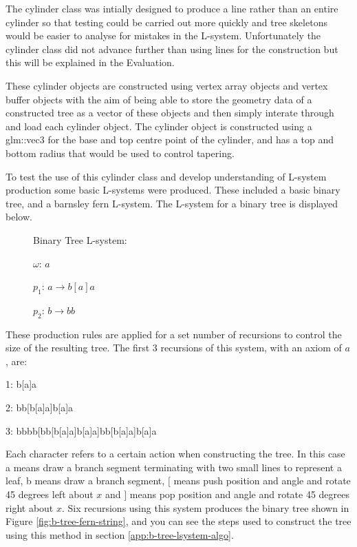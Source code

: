 \documentclass[final]{cmpreport}
\begin{document}
The cylinder class was intially designed to produce a line rather than an entire cylinder so that 
testing could be carried out more quickly and tree skeletons would be easier to analyse for 
mistakes in the L-system. Unfortunately the cylinder class did not advance further than using 
lines for the construction but this will be explained in the Evaluation. 

These cylinder objects are constructed using vertex array objects and vertex buffer objects with 
the aim of being able to store the geometry data of a constructed tree as a vector of these 
objects and then simply interate through and load each cylinder object. The cylinder object is 
constructed using a glm::vec3 for the base and top centre point of the cylinder, and has a top 
and bottom radius that would be used to control tapering. 

To test the use of this cylinder class and develop understanding of L-system production some 
basic L-systems were produced. These included a basic binary tree, and a barnsley fern L-system.
The L-system for a binary tree is displayed below.

\begin{figure}[ht]
    Binary Tree L-system:

    $\omega$: $a$ 

    $p_1$: $a \rightarrow b[a]a$

    $p_2$: $b \rightarrow bb$
    \label{fig:b-tree-string-system}
\end{figure}

These production rules are applied for a set number of recursions to control the size of the 
resulting tree. The first 3 recursions of this system, with an axiom of $a$, are:

1: b[a]a

2: bb[b[a]a]b[a]a

3: bbbb[bb[b[a]a]b[a]a]bb[b[a]a]b[a]a

Each character refers to a certain action when constructing the tree. In this case a means draw 
a branch segment terminating with two small lines to represent a leaf, b means draw a branch 
segment, $[$ means push position and angle and rotate 45 degrees left about $x$ and $]$ means 
pop position and angle and rotate 45 degrees right about $x$. Six recursions using this system 
produces the binary tree shown in Figure \ref{fig:b-tree-fern-string}, and you can see the 
steps used to construct the tree using this method in section \ref{app:b-tree-lsystem-algo}.
\end{document}
